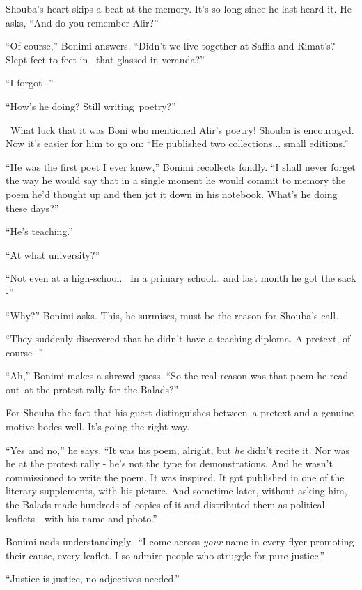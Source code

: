 \documentclass[twoside,11pt]{book}
\begin{document}
Shouba's heart skips a beat at the memory. It's so long since he last heard it. He asks, ``And do you
remember Alir?''

``Of course,'' Bonimi answers. ``Didn't we live together at Saffia and Rimat's?
Slept feet-to-feet in{~} that glassed-in-veranda?''

``I forgot -''

``How's he doing? Still writing~poetry?''

~What luck that it was Boni who mentioned Alir's poetry! Shouba is encouraged. Now it's easier for him to go on:
``He published two collections... small{ }editions.''

``He was the first poet I ever knew,'' Bonimi recollects fondly. ``I shall never
forget the way he would say that in a single moment he would commit to memory the poem he'd thought up and then jot it
down in his notebook. What's he doing these days?''

``He's teaching.''

``At what university?''

``Not even {at} a high-school.{ \ }{In a} primary
school{\dots} and last month he got the sack -''

``Why?'' Bonimi asks. This, he surmises, must be the reason for Shouba's call.

``They suddenly discovered that he didn't have a teaching diploma. A pretext, of course -''

``Ah,'' Bonimi makes a shrewd guess. ``So the real reason was that poem he read
out~at the protest rally for the Balads?''

For Shouba the fact that his guest distinguishes between~a pretext and a genuine motive bodes well. It's going the right
way.

``Yes and no,'' he says. ``It was his poem, alright, but \textit{he} didn't
recite it. Nor was he at the protest rally - he's not the type for demonstrations. And he wasn't commissioned to write
the poem. It was inspired. It got published in one of the literary supplements, with his picture. And sometime later,
without asking him, the Balads made hundreds of~copies of it and distributed them as political leaflets - with his name
and photo.''

Bonimi nods understandingly,~``I come across \textit{your }name in every flyer promoting their cause, every
leaflet. I so admire people who struggle for pure justice.''

``Justice is justice, no adjectives needed.''
\end{document}
